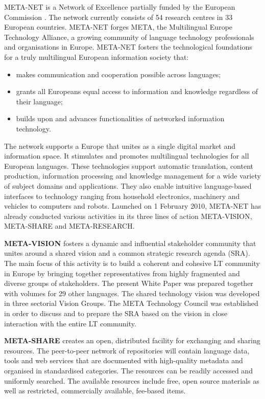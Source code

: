 \begin{multicols}{2}

META-NET is a Network of Excellence partially funded by the European Commission \cite{rehm2011}. The network currently consists of 54 research centres in 33 European countries. META-NET forges META, the Multilingual Europe Technology Alliance, a growing community of language technology professionals and organisations in Europe. META-NET fosters the technological foundations for a truly multilingual European information society that:

\begin{itemize}
\item makes communication and cooperation possible across languages;
\item grants all Europeans equal access to information and knowledge regardless of their language;
\item builds upon and advances functionalities of networked information technology.
\end{itemize}

The network supports a Europe that unites as a single digital market and information space. It stimulates and promotes multilingual technologies for all European languages. These technologies support automatic translation, content production, information processing and knowledge management for a wide variety of subject domains and applications. They also enable intuitive language-based interfaces to technology ranging from household electronics, machinery and vehicles to computers and robots.
Launched on 1 February 2010, META-NET has already conducted various activities in its three lines of action META-VISION, META-SHARE and META-RESEARCH.

\textbf{META-VISION} fosters a dynamic and influential stakeholder community that unites around a shared vision and a common strategic research agenda (SRA). The main focus of this activity is to build a coherent and cohesive LT community in Europe by bringing together representatives from highly fragmented and diverse groups of stakeholders. The present White Paper was prepared together with volumes for 29 other languages. The shared technology vision was developed in three sectorial Vision Groups. The META Technology Council was established in order to discuss and to prepare the SRA based on the vision in close interaction with the entire LT community.

\textbf{META-SHARE} creates an open, distributed facility for exchanging and sharing resources. The peer-to-peer network of repositories will contain language data, tools and web services that are documented with high-quality metadata and organised in standardised categories. The resources can be readily accessed and uniformly searched. The available resources include free, open source materials as well as restricted, commercially available, fee-based items.


\end{multicols}
